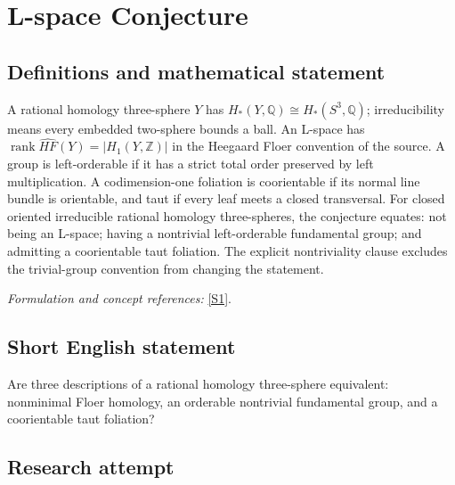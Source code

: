 \documentclass[11pt,a4paper]{article}
\newcommand{\Z}{\mathbb{Z}}
\newcommand{\Q}{\mathbb{Q}}
\newcommand{\sref}[2]{\hyperlink{source:#1:#2}{[S#2]}}
\newif\ifshowcatalogue
\newcommand{\cataloguescope}[1]{\ifshowcatalogue
 \paragraph{Exact scope in the supplied catalogue.}
 \begin{quote}\small #1\end{quote}\fi}
\numberwithin{equation}{section}
\begin{document}
\setcounter{section}{0}
\clearpage
\section*{\texorpdfstring{L-space Conjecture}{L-space Conjecture}}\label{statement}
\subsection{Definitions and mathematical statement}
A rational homology three-sphere $Y$ has $H_*(Y,\Q)\cong H_*(S^3,\Q)$; irreducibility means every embedded two-sphere bounds a ball. An L-space has
$\operatorname{rank}\widehat{HF}(Y)=|H_1(Y,\Z)|$ in the Heegaard Floer convention of the source. A group is left-orderable if it has a strict total order preserved by left multiplication. A codimension-one foliation is coorientable if its normal line bundle is orientable, and taut if every leaf meets a closed transversal. For closed oriented irreducible rational homology three-spheres, the conjecture equates: not being an L-space; having a nontrivial left-orderable fundamental group; and admitting a coorientable taut foliation. The explicit nontriviality clause excludes the trivial-group convention from changing the statement.
\par\smallskip\textit{Formulation and concept references:} \sref{statement}{1}.
\cataloguescope{Prove or disprove: for a closed, oriented, irreducible rational homology 3-sphere Y, the following are equivalent: (1) Y is not a Heegaard Floer L-space; (2) pi\_1(Y) is nontrivial and admits a left-invariant strict total order; (3) Y admits a coorientable taut foliation.}
\subsection{Short English statement}
Are three descriptions of a rational homology three-sphere equivalent: nonminimal Floer homology, an orderable nontrivial fundamental group, and a coorientable taut foliation?
\subsection{Research attempt}
\end{document}
